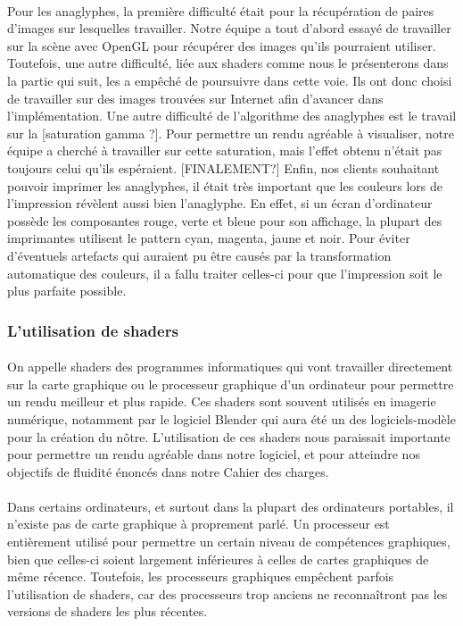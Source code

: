\paragraph{}
Pour les anaglyphes, la première difficulté était pour la récupération de paires d'images sur lesquelles travailler. Notre équipe a tout d'abord essayé de travailler sur la scène avec OpenGL pour récupérer des images qu'ils pourraient utiliser. Toutefois, une autre difficulté, liée aux shaders comme nous le présenterons dans la partie qui suit, les a empêché de poursuivre dans cette voie. Ils ont donc choisi de travailler sur des images trouvées sur Internet afin d'avancer dans l'implémentation. 
Une autre difficulté de l'algorithme des anaglyphes est le travail sur la [saturation gamma ?]. Pour permettre un rendu agréable à visualiser, notre équipe a cherché à travailler sur cette saturation, mais l'effet obtenu n'était pas toujours celui qu'ils espéraient. [FINALEMENT?]
Enfin, nos clients souhaitant pouvoir imprimer les anaglyphes, il était très important que les couleurs lors de l'impression révèlent aussi bien l'anaglyphe. En effet, si un écran d'ordinateur possède les composantes rouge, verte et bleue pour son affichage, la plupart des imprimantes utilisent le pattern cyan, magenta, jaune et noir. Pour éviter d'éventuels artefacts qui auraient pu être causés par la transformation automatique des couleurs, il a fallu traiter celles-ci pour que l'impression soit le plus parfaite possible.

\subsubsection{L'utilisation de shaders}
\paragraph{}
On appelle shaders des programmes informatiques qui vont travailler directement sur la carte graphique ou le processeur graphique d'un ordinateur pour permettre un rendu meilleur et plus rapide. Ces shaders sont souvent utilisés en imagerie numérique, notamment par le logiciel Blender qui aura été un des logiciels-modèle pour la création du nôtre. L'utilisation de ces shaders nous paraissait importante pour permettre un rendu agréable dans notre logiciel, et pour atteindre nos objectifs de fluidité énoncés dans notre Cahier des charges.

\paragraph{}
Dans certains ordinateurs, et surtout dans la plupart des ordinateurs portables, il n'existe pas de carte graphique à proprement parlé. Un processeur est entièrement utilisé pour permettre un certain niveau de compétences graphiques, bien que celles-ci soient largement inférieures à celles de cartes graphiques de même récence. Toutefois, les processeurs graphiques empêchent parfois l'utilisation de shaders, car des processeurs trop anciens ne reconnaîtront pas les versions de shaders les plus récentes.

